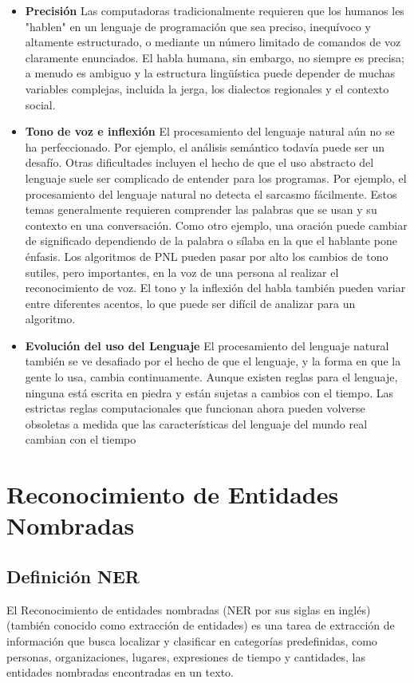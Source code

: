 \documentclass{llncs}
\begin{document}
	\begin{itemize}
		
		\item \textbf {Precisi\'on} Las computadoras tradicionalmente requieren que los humanos les "hablen" en un lenguaje de programación que sea preciso, inequívoco y altamente estructurado, o mediante un número limitado de comandos de voz claramente enunciados. El habla humana, sin embargo, no siempre es precisa; a menudo es ambiguo y la estructura lingüística puede depender de muchas variables complejas, incluida la jerga, los dialectos regionales y el contexto social.
		
		\item \textbf{Tono de voz e inflexi\'on} El procesamiento del lenguaje natural aún no se ha perfeccionado. Por ejemplo, el análisis semántico todavía puede ser un desafío. Otras dificultades incluyen el hecho de que el uso abstracto del lenguaje suele ser complicado de entender para los programas. Por ejemplo, el procesamiento del lenguaje natural no detecta el sarcasmo fácilmente. Estos temas generalmente requieren comprender las palabras que se usan y su contexto en una conversación. Como otro ejemplo, una oración puede cambiar de significado dependiendo de la palabra o sílaba en la que el hablante pone énfasis. Los algoritmos de PNL pueden pasar por alto los cambios de tono sutiles, pero importantes, en la voz de una persona al realizar el reconocimiento de voz. El tono y la inflexión del habla también pueden variar entre diferentes acentos, lo que puede ser difícil de analizar para un algoritmo. 
		
		\item \textbf{Evoluci\'on del uso del Lenguaje} El procesamiento del lenguaje natural también se ve desafiado por el hecho de que el lenguaje, y la forma en que la gente lo usa, cambia continuamente. Aunque existen reglas para el lenguaje, ninguna está escrita en piedra y están sujetas a cambios con el tiempo. Las estrictas reglas computacionales que funcionan ahora pueden volverse obsoletas a medida que las características del lenguaje del mundo real cambian con el tiempo
	\end{itemize}
	
	\section{Reconocimiento de Entidades Nombradas} 
	
	\subsection{Definici\'on NER}
	El Reconocimiento de entidades nombradas (NER por sus siglas en inglés) (también conocido como extracción de entidades) es una tarea de extracción de información que busca localizar y clasificar en categorías predefinidas, como personas, organizaciones, lugares, expresiones de tiempo y cantidades, las entidades nombradas encontradas en un texto.
	
\end{document}
